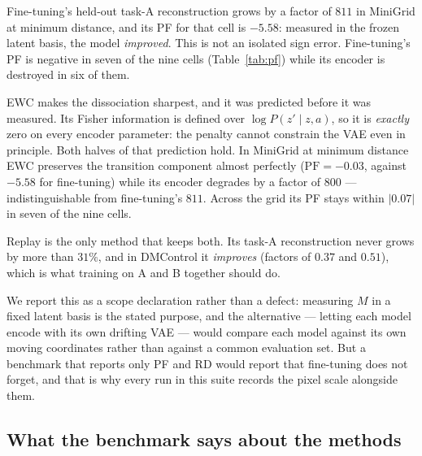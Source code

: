 Fine-tuning's held-out task-A reconstruction grows by a factor of $811$ in
MiniGrid at minimum distance, and its PF for that cell is $-5.58$: measured in
the frozen latent basis, the model \emph{improved}. This is not an isolated
sign error. Fine-tuning's PF is negative in seven of the nine cells
(Table~\ref{tab:pf}) while its encoder is destroyed in six of them.

EWC makes the dissociation sharpest, and it was predicted before it was
measured. Its Fisher information is defined over $\log P(z' \mid z, a)$, so it
is \emph{exactly} zero on every encoder parameter: the penalty cannot constrain
the VAE even in principle. Both halves of that prediction hold. In MiniGrid at
minimum distance EWC preserves the transition component almost perfectly
($\text{PF} = -0.03$, against $-5.58$ for fine-tuning) while its encoder
degrades by a factor of $800$ --- indistinguishable from fine-tuning's $811$.
Across the grid its PF stays within $|0.07|$ in seven of the nine cells.

Replay is the only method that keeps both. Its task-A reconstruction never grows
by more than $31\%$, and in DMControl it \emph{improves} (factors of $0.37$ and
$0.51$), which is what training on A and B together should do.

We report this as a scope declaration rather than a defect: measuring $M$ in a
fixed latent basis is the stated purpose, and the alternative --- letting each
model encode with its own drifting VAE --- would compare each model against its
own moving coordinates rather than against a common evaluation set. But a
benchmark that reports only PF and RD would report that fine-tuning does not
forget, and that is why every run in this suite records the pixel scale
alongside them.

\subsection{What the benchmark says about the methods}
\label{sec:results:methods}

\begin{table}[t]
  \centering
  
  \caption{PF (prediction fidelity) by method and cell; median over the cell's
  seeds (ten in the six discriminating cells, five in the controls). Positive
  means the transition component got worse at task~A. $\ast$ marks cells whose
  seed sample is right-skewed.}
  \label{tab:pf}
\end{table}

\begin{table}[t]
  \centering
  
  \caption{RD (rollout divergence) by method and cell; median over the cell's
  seeds. $\ast$ marks right-skewed cells.}
  \label{tab:rd}
\end{table}

